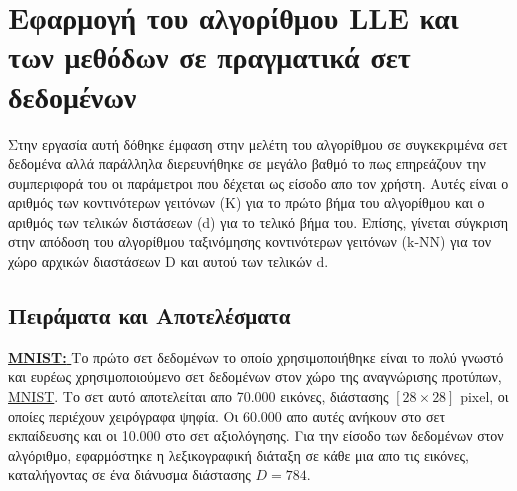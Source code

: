 \section{Εφαρμογή του αλγορίθμου \textlatin{LLE} και των μεθόδων σε πραγματικά σετ δεδομένων}
\par
Στην εργασία αυτή δόθηκε έμφαση στην μελέτη του αλγορίθμου σε συγκεκριμένα σετ δεδομένα αλλά παράλληλα διερευνήθηκε σε μεγάλο βαθμό το πως επηρεάζουν την συμπεριφορά του οι παράμετροι που δέχεται ως είσοδο απο τον χρήστη. Αυτές είναι ο αριθμός των κοντινότερων γειτόνων \textlatin{(K)} για το πρώτο βήμα του αλγορίθμου και ο αριθμός των τελικών διστάσεων \textlatin{(d)} για το τελικό βήμα του. Επίσης, γίνεται σύγκριση στην απόδοση του αλγορίθμου ταξινόμησης κοντινότερων γειτόνων \textlatin{(k-NN)} για τον χώρο αρχικών διαστάσεων \textlatin{D} και αυτού των τελικών \textlatin{d}. 

\subsection{Πειράματα και Αποτελέσματα}
\par
\href{http://yann.lecun.com/exdb/mnist/}{\textbf{\textlatin{MNIST: }}}Το πρώτο σετ δεδομένων το οποίο χρησιμοποιήθηκε είναι το πολύ γνωστό και ευρέως χρησιμοποιούμενο σετ δεδομένων στον χώρο της αναγνώρισης προτύπων, \href{http://yann.lecun.com/exdb/mnist/}{\textlatin{MNIST}}. Το σετ αυτό αποτελείται απο 70.000 εικόνες, διάστασης $[28 \times 28]$ \textlatin{pixel}, οι οποίες περιέχουν χειρόγραφα ψηφία. Οι 60.000 απο αυτές ανήκουν στο σετ εκπαίδευσης και οι 10.000 στο σετ αξιολόγησης. Για την είσοδο των δεδομένων στον αλγόριθμο, εφαρμόστηκε η λεξικογραφική διάταξη σε κάθε μια απο τις εικόνες, καταλήγοντας σε ένα διάνυσμα διάστασης $D = 784$.
